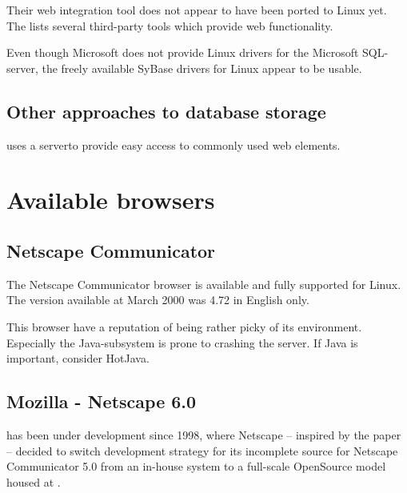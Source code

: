   Their web integration tool does not appear to have been ported to
  Linux yet.  The  lists several third-party tools which provide web
  functionality.

  Even though Microsoft does not provide Linux drivers for the
  Microsoft SQL-server, the freely available SyBase drivers for Linux
  appear to be usable.

\subsection{Other approaches to database storage}

 uses a
 serverto provide easy access to commonly
used web elements.


\section{Available browsers}

\subsection{Netscape Communicator}
\label{sec:netscape-communicator}

The Netscape Communicator browser is available and fully supported for
Linux.  The version available at March 2000 was 4.72 in English only.

This browser have a reputation of being rather picky of its
environment.  Especially the Java-subsystem is prone to crashing the
server.  If Java is important, consider HotJava.


\subsection{Mozilla - Netscape 6.0}
\label{sec:mozilla}

 has been under
development since 1998, where Netscape -- inspired by the  paper -- decided to switch development
strategy for its incomplete source for Netscape Communicator 5.0 from
an in-house system to a full-scale OpenSource model housed at
.

